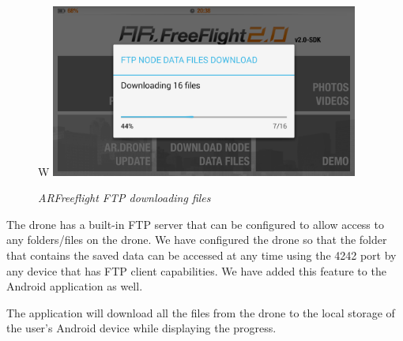 \begin{figure}[ht]
\begin{center}W
\includegraphics[width=0.9\textwidth]{implementation/android_ftp.png}
\end{center}
\caption{\small \itshape{ARFreeflight FTP downloading files}}
\end{figure}

The drone has a built-in FTP server that can be configured to allow access to any folders/files on the drone. We have configured the drone so that the folder that contains the saved data can be accessed at any time using the 4242 port by any device that has FTP client capabilities. We have added this feature to the Android application as well.

The application will download all the files from the drone to the local storage of the user's Android device while displaying the progress.
